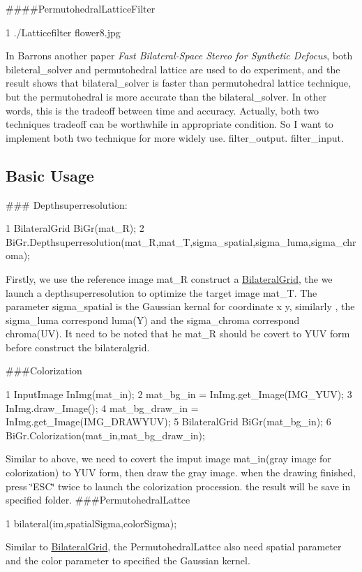 \#\#\#\#\+Permutohedral\+Lattice\+Filter 
\begin{DoxyCode}
1 ./Latticefilter flower8.jpg
\end{DoxyCode}
 In Barron\textquotesingle{}s another paper {\itshape Fast Bilateral-\/\+Space Stereo for Synthetic Defocus}, both bileteral\+\_\+solver and permutohedral lattice are used to do experiment, and the result shows that bilateral\+\_\+solver is faster than permutohedral lattice technique, but the permutohedral is more accurate than the bilateral\+\_\+solver. In other words, this is the tradeoff between time and accuracy. Actually, both two techniques\textquotesingle{} tradeoff can be worthwhile in appropriate condition. So I want to implement both two technique for more widely use.  filter\+\_\+output.  filter\+\_\+input.



 \subsection*{Basic Usage}

\#\#\# Depthsuperresolution\+: 
\begin{DoxyCode}
1 BilateralGrid BiGr(mat\_R);
2 BiGr.Depthsuperresolution(mat\_R,mat\_T,sigma\_spatial,sigma\_luma,sigma\_chroma);
\end{DoxyCode}
 Firstly, we use the reference image mat\+\_\+R construct a \hyperlink{classBilateralGrid}{Bilateral\+Grid}, the we launch a depthsuperresolution to optimize the target image mat\+\_\+T. The parameter sigma\+\_\+spatial is the Gaussian kernal for coordinate x y, similarly , the sigma\+\_\+luma correspond luma(\+Y) and the sigma\+\_\+chroma correspond chroma(\+U\+V). It need to be noted that he mat\+\_\+R should be covert to Y\+UV form before construct the bilateralgrid.

\#\#\#\+Colorization 
\begin{DoxyCode}
1 InputImage InImg(mat\_in);
2 mat\_bg\_in = InImg.get\_Image(IMG\_YUV);
3 InImg.draw\_Image();
4 mat\_bg\_draw\_in = InImg.get\_Image(IMG\_DRAWYUV);
5 BilateralGrid BiGr(mat\_bg\_in);
6 BiGr.Colorization(mat\_in,mat\_bg\_draw\_in);
\end{DoxyCode}
 Similar to above, we need to covert the imput image mat\+\_\+in(gray image for colorization) to Y\+UV form, then draw the gray image. when the drawing finished, press \char`\"{}\+E\+S\+C\char`\"{} twice to launch the colorization procession. the result will be save in specified folder. \#\#\#\+Permutohedral\+Lattce 
\begin{DoxyCode}
1 bilateral(im,spatialSigma,colorSigma);
\end{DoxyCode}
 Similar to \hyperlink{classBilateralGrid}{Bilateral\+Grid}, the Permutohedral\+Lattce also need spatial parameter and the color parameter to specified the Gaussian kernel.




